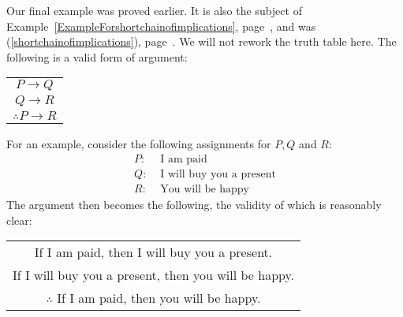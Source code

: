 Our final example was proved earlier.  It is also the subject of
Example~\ref{ExampleForshortchainofimplications}, 
page~\pageref{ExampleForshortchainofimplications},
and was (\ref{shortchainofimplications}), 
page~\pageref{shortchainofimplications}.  We will not 
rework the truth table here.
\bex
The following is a valid form of argument:
\begin{center}
\begin{tabular}{c}
$P\longrightarrow Q$\\
$Q\longrightarrow R$\\ \hline
$\therefore P\longrightarrow R$
\end{tabular}
\end{center}
For an example, consider the following assignments for $P,Q$ and $R$:
\begin{align*}
P:&\text{ I am paid}\\
Q:&\text{ I will buy you a present}\\
R:&\text{ You will be happy}
\end{align*}
The argument then  becomes the following, the
validity of which is reasonably clear:
\begin{center}
\begin{tabular}{c}
If I am paid, then I will buy you a present.\\
If I will buy you a present, then you will be happy.\\ \hline
$\therefore$ If I am paid, then you will be happy.
\end{tabular}
\end{center}
\eex

